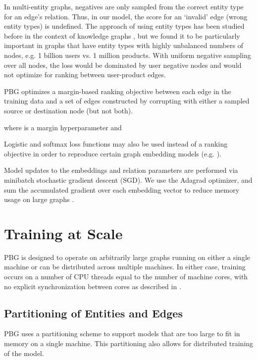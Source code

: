 \documentclass{article}
\begin{document}
In multi-entity graphs, negatives are only sampled from the correct entity type for an edge's relation. Thus, in our model, the score for an `invalid' edge (wrong entity types) is undefined. The approach of using entity types has been studied before in the context of knowledge graphs \cite{krompass2015type}, but we found it to be particularly important in graphs that have entity types with highly unbalanced numbers of nodes, e.g. 1 billion users vs. 1 million products. With uniform negative sampling over all nodes, the loss would be dominated by user negative nodes and would not optimize for ranking between user-product edges.

PBG optimizes a margin-based ranking objective between each edge  in the training data and a set of edges  constructed by corrupting  with either a sampled source or destination node (but not both).



where  is a margin hyperparameter and



Logistic and softmax loss functions may also be used instead of a ranking objective in order to reproduce certain graph embedding models (e.g. \citealt{trouillon2016complex}).

Model updates to the embeddings and relation parameters are performed via minibatch stochastic gradient descent (SGD). We use the Adagrad optimizer, and sum the accumulated gradient  over each embedding vector to reduce memory usage on large graphs \cite{adagrad}.


\section{Training at Scale}
\label{sec:large-scale}

PBG is designed to operate on arbitrarily large graphs running on either a single machine or can be distributed across multiple machines. In either case, training occurs on a number of CPU threads equal to the number of machine cores, with no explicit synchronization between cores as described in \cite{hogwild}. 



\subsection{Partitioning of Entities and Edges}
\label{sec:partition}
PBG uses a partitioning scheme to support models that are too large to fit in memory on a single machine. This partitioning also allows for distributed training of the model. 
\end{document}
